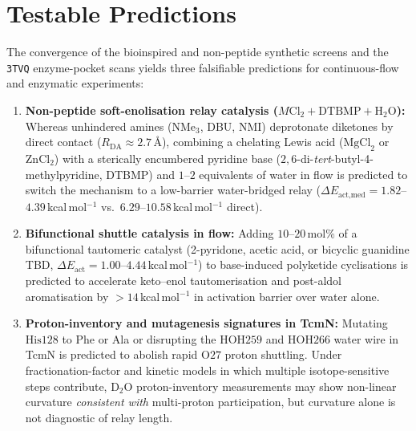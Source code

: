 \documentclass[11pt,a4paper]{article}
\begin{document}
\section{Testable Predictions}
The convergence of the bioinspired and non-peptide synthetic screens and the \texttt{3TVQ} enzyme-pocket scans yields three falsifiable predictions for continuous-flow and enzymatic experiments:
\begin{enumerate}
\item \textbf{Non-peptide soft-enolisation relay catalysis ($M\text{Cl}_2 + \text{DTBMP} + \text{H}_2\text{O}$):} Whereas unhindered amines ($\text{NMe}_3$, DBU, NMI) deprotonate diketones by direct contact ($R_{\text{DA}} \approx 2.7$\,\AA{}), combining a chelating Lewis acid ($\text{MgCl}_2$ or $\text{ZnCl}_2$) with a sterically encumbered pyridine base ($2,6$-di-\textit{tert}-butyl-4-methylpyridine, DTBMP) and $1$--$2$ equivalents of water in flow is predicted to switch the mechanism to a low-barrier water-bridged relay ($\Delta E_{\text{act,med}} = 1.82$--$4.39$\,kcal\,mol$^{-1}$ vs.\ $6.29$--$10.58$\,kcal\,mol$^{-1}$ direct).
\item \textbf{Bifunctional shuttle catalysis in flow:} Adding $10$--$20$\,mol\% of a bifunctional tautomeric catalyst (2-pyridone, acetic acid, or bicyclic guanidine TBD, $\Delta E_{\text{act}} = 1.00$--$4.44$\,kcal\,mol$^{-1}$) to base-induced polyketide cyclisations is predicted to accelerate keto--enol tautomerisation and post-aldol aromatisation by $>14$\,kcal\,mol$^{-1}$ in activation barrier over water alone.
\item \textbf{Proton-inventory and mutagenesis signatures in TcmN:} Mutating $\text{His128}$ to Phe or Ala or disrupting the $\text{HOH259}$ and $\text{HOH266}$ water wire in TcmN is predicted to abolish rapid $\text{O27}$ proton shuttling. Under fractionation-factor and kinetic models in which multiple isotope-sensitive steps contribute, $\text{D}_2\text{O}$ proton-inventory measurements \cite{venkatasubban1984} may show non-linear curvature \textit{consistent with} multi-proton participation, but curvature alone is not diagnostic of relay length.
\end{enumerate}
\end{document}
